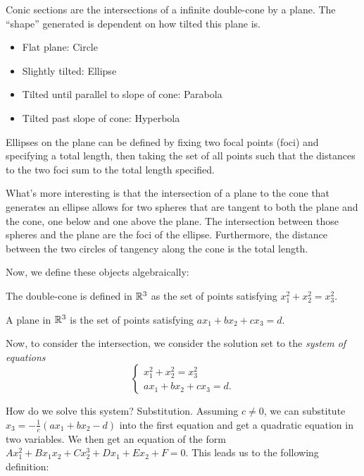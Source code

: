 Conic sections are the intersections of a infinite double-cone by a plane. The ``shape'' generated is dependent on how tilted this plane is.

\begin{itemize}
    \item Flat plane: Circle
    \item Slightly tilted: Ellipse
    \item Tilted until parallel to slope of cone: Parabola
    \item Tilted past slope of cone: Hyperbola
\end{itemize}

Ellipses on the plane can be defined by fixing two focal points (foci) and specifying a total length, then taking the set of all points such that the distances to the two foci sum to the total length specified.

What's more interesting is that the intersection of a plane to the cone that generates an ellipse allows for two spheres that are tangent to both the plane and the cone, one below and one above the plane. The intersection between those spheres and the plane are the foci of the ellipse. Furthermore, the distance between the two circles of tangency along the cone is the total length. 

Now, we define these objects algebraically:

\begin{definition}
    The double-cone is defined in $\mathbb R^3$ as the set of points satisfying $x_1^2 + x_2^2 = x_3^2$.
\end{definition}

\begin{definition}[Plane]
    A plane in $\mathbb R^3$ is the set of points satisfying $ax_1 + bx_2 + cx_3 = d$.
\end{definition}

Now, to consider the intersection, we consider the solution set to the \emph{system of equations} \[\begin{cases}
    x_1^2 + x_2^2 = x_3^2\\
    ax_1 + bx_2 + cx_3 = d.
\end{cases}\]

How do we solve this system? Substitution. Assuming $c \ne 0$, we can substitute $x_3 = -\frac{1}{c}(ax_1 + bx_2 - d)$ into the first equation and get a quadratic equation in two variables. We then get an equation of the form $Ax_1^2 + Bx_1x_2 + Cx_2^3 + Dx_1 + Ex_2 + F = 0$. This leads us to the following definition:

